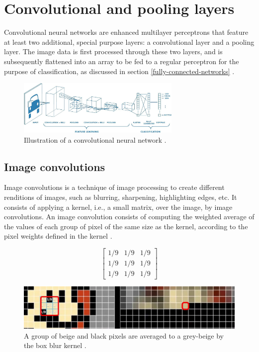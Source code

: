 \documentclass[12pt,a4paper,notitlepage]{article}
\begin{document}
\section{Convolutional and pooling layers}
Convolutional neural networks are enhanced multilayer perceptrons that feature at least two additional, special purpose layers: a convolutional layer and a pooling layer. The image data is first processed through these two layers, and is subsequently flattened into an array to be fed to a regular perceptron for the purpose of classification, as discussed in section \ref{fully-connected-networks} \cite{saha_comprehensive_2018}.

\begin{figure}[htbp]
	\centering
		\includegraphics[width=0.70\textwidth]{images/convolutional-neural-network.jpeg}
	\caption{Illustration of a convolutional neural network \cite{saha_comprehensive_2018}.}
	\label{fig:convolutional-neural-network}
\end{figure}

\subsection{Image convolutions}
Image convolutions is a technique of image processing to create different renditions of images, such as blurring, sharpening, highlighting edges, etc. It consists of applying a kernel, i.e., a small matrix, over the image, by image convolutions. An image convolution consists of computing the weighted average of the values of each group of pixel of the same size as the kernel, according to the pixel weights defined in the kernel \cite{sanderson_convolutions_2020}.

\begin{displaymath}
	\begin{bmatrix}
		1/9 & 1/9 & 1/9 \\
		1/9 & 1/9 & 1/9 \\
		1/9 & 1/9 & 1/9
	\end{bmatrix}
\end{displaymath}

\begin{figure}[htbp]
	\centering
		\includegraphics[width=1.00\textwidth]{images/box-blur.jpg}
	\caption{A group of beige and black pixels are averaged to a grey-beige by the box blur kernel \cite{sanderson_convolutions_2020}.}
	\label{fig:box-blur}
\end{figure}
\end{document}
